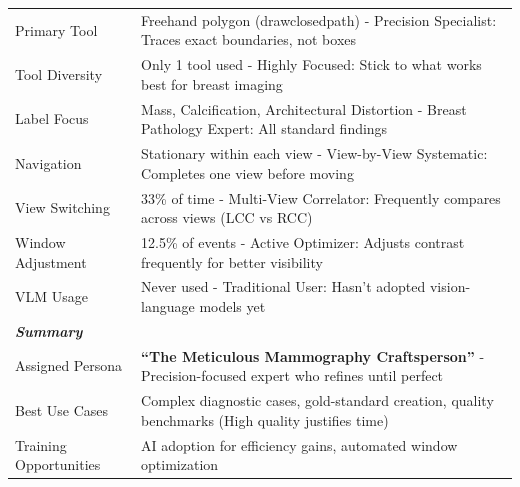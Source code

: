 \documentclass{article}
\begin{document}
\begin{table}[H]
\begin{tabular}{lp{10cm}}
        Primary Tool & Freehand polygon (drawclosedpath) - Precision Specialist: Traces exact boundaries, not boxes \\
        Tool Diversity & Only 1 tool used - Highly Focused: Stick to what works best for breast imaging \\
        Label Focus & Mass, Calcification, Architectural Distortion - Breast Pathology Expert: All standard findings \\
        Navigation & Stationary within each view - View-by-View Systematic: Completes one view before moving \\
        View Switching & 33\% of time - Multi-View Correlator: Frequently compares across views (LCC vs RCC) \\
        Window Adjustment & 12.5\% of events - Active Optimizer: Adjusts contrast frequently for better visibility \\
        VLM Usage & Never used - Traditional User: Hasn't adopted vision-language models yet \\
        \midrule
        \multicolumn{2}{l}{\textit{\textbf{Summary}}} \\
        Assigned Persona & \textbf{``The Meticulous Mammography Craftsperson''} - Precision-focused expert who refines until perfect \\
        Best Use Cases & Complex diagnostic cases, gold-standard creation, quality benchmarks (High quality justifies time) \\
        Training Opportunities & AI adoption for efficiency gains, automated window optimization \\
        \bottomrule
    \end{tabular}
    \label{tab:expert-profile-johnson}
\end{table}
\end{document}
